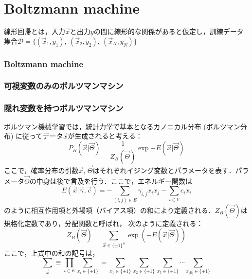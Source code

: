 \part{Boltzmann machine}

線形回帰とは，入力$\vec{x}$と出力$y$の間に線形的な関係があると仮定し，訓練データ集合$\mathcal{D}=\{(\vec{x}_1,y_1),\ (\vec{x}_2,y_2),\ (\vec{x}_N,y_N)\}$
\section{Boltzmann machine}
\section{可視変数のみのボルツマンマシン}
\section{隠れ変数を持つボルツマンマシン}
ボルツマン機械学習では，統計力学で基本となるカノニカル分布 (ボルツマン分布) に従ってデータ$\Vec{x}$が生成されると考える：
\begin{equation}
    P_B(\Vec{x}|\Vec{\Theta}) = \frac{1}{Z_B(\Vec{\Theta})}\exp{-E(\Vec{x}|\Vec{\Theta})}
\end{equation}
ここで，確率分布の引数$\Vec{x}$, $\Vec{\Theta}$はそれぞれイジング変数とパラメータを表す．パラメータ$\Vec{\Theta}$の中身は後で言及を行う．ここで，エネルギー関数は
\begin{equation}
    E(\Vec{x}|\Vec{\gamma},\Vec{c}) = -\sum_{(i,j)\in E}\gamma_{i,j} x_i x_j - \sum_{i \in V}c_ix_i
\end{equation}
のように相互作用項と外場項（バイアス項）の和により定義される．$Z_B(\vec{\Theta})$は規格化定数であり，分配関数と呼ばれ，
次のように定義される：
\begin{equation}
    Z_B(\vec{\Theta}) = \sum_{\Vec{x}\in\{\pm1\}^{n}} \exp{(-E(\Vec{x}|\Vec{\Theta}))}
\end{equation}
ここで，上式中の和の記号は，
\begin{equation}
    \sum_{\Vec{x}} \equiv \prod_{i\in E} \sum_{x_i\in\{\pm 1\}} 
    = \sum_{x_1\in\{\pm 1\}} \sum_{x_2\in\{\pm 1\}} \sum_{x_3\in\{\pm 1\}} 
    \cdots \sum_{x_|E|\in\{\pm 1\}} 
\end{equation}


